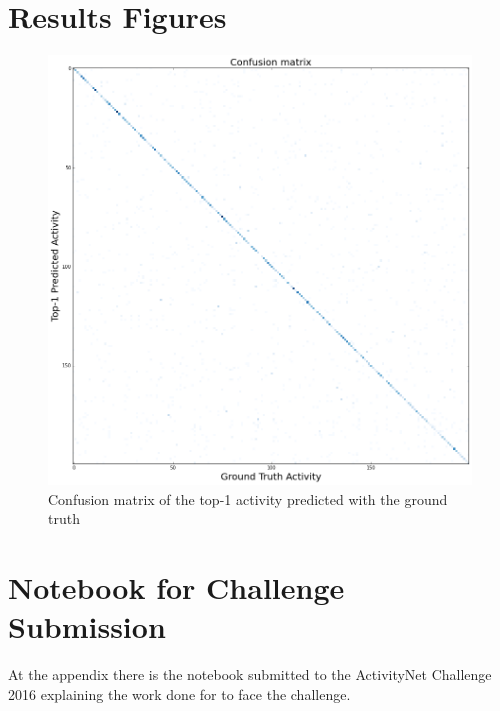 \chapter{Results Figures}

\begin{figure}[ht]
\begin{center}
\includegraphics[width=1\linewidth]{img/results/confussion_matrix}
\end{center}
\caption{Confusion matrix of the top-1 activity predicted with the ground truth}
\label{fig:confussion_matrix}
\end{figure}


\chapter{Notebook for Challenge Submission}

At the appendix there is the notebook submitted to the ActivityNet Challenge 2016 explaining the work done for to face the challenge.

